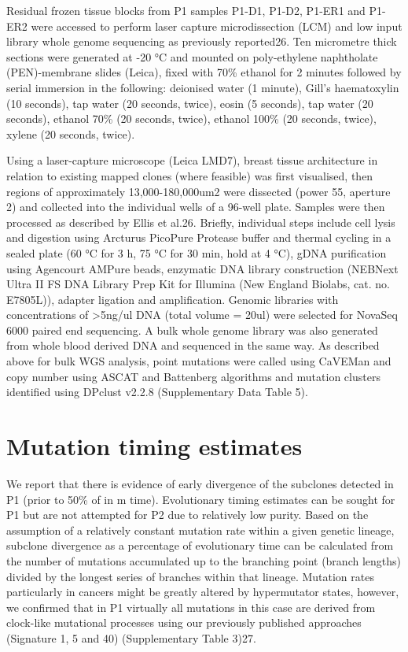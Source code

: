 Residual frozen tissue blocks from P1 samples P1-D1, P1-D2, P1-ER1 and P1-ER2 were accessed to perform laser capture microdissection (LCM) and low input library whole genome sequencing as previously reported26. Ten micrometre thick sections were generated at -20 °C and mounted on poly-ethylene naphtholate (PEN)-membrane slides (Leica), fixed with 70\% ethanol for 2 minutes followed by serial immersion in the following: deionised water (1 minute), Gill’s haematoxylin (10 seconds), tap water (20 seconds, twice), eosin (5 seconds), tap water (20 seconds), ethanol 70\% (20 seconds, twice), ethanol 100\% (20 seconds, twice), xylene (20 seconds, twice). 

Using a laser-capture microscope (Leica LMD7), breast tissue architecture in relation to existing mapped clones (where feasible) was first visualised, then regions of approximately 13,000-180,000um2 were dissected (power 55, aperture 2) and collected into the individual wells of a 96-well plate. Samples were then processed as described by Ellis et al.26. Briefly, individual steps include cell lysis and digestion using Arcturus PicoPure Protease buffer and thermal cycling in a sealed plate (60 °C for 3 h, 75 °C for 30 min, hold at 4 °C), gDNA purification using Agencourt AMPure beads, enzymatic DNA library construction (NEBNext Ultra II FS DNA Library Prep Kit for Illumina (New England Biolabs, cat. no. E7805L)), adapter ligation and amplification. Genomic libraries with concentrations of >5ng/ul DNA (total volume = 20ul) were selected for NovaSeq 6000 paired end sequencing. A bulk whole genome library was also generated from whole blood derived DNA and sequenced in the same way. As described above for bulk WGS analysis, point mutations were called using CaVEMan and copy number using ASCAT and Battenberg algorithms and mutation clusters identified using DPclust v2.2.8 (Supplementary Data Table 5). 

\section{Mutation timing estimates}
\label{sec:protocol-suppl-timing}

We report that there is evidence of early divergence of the subclones detected in P1 (prior to 50\% of in m time). Evolutionary timing estimates can be sought for P1 but are not attempted for P2 due to relatively low purity.  Based on the assumption of a relatively constant mutation rate within a given genetic lineage, subclone divergence as a percentage of evolutionary time can be calculated from the number of mutations accumulated up to the branching point (branch lengths) divided by the longest series of branches within that lineage. Mutation rates particularly in cancers might be greatly altered by hypermutator states, however, we confirmed that in P1 virtually all mutations in this case are derived from clock-like mutational processes using our previously published approaches (Signature 1, 5 and 40) (Supplementary Table 3)27. 